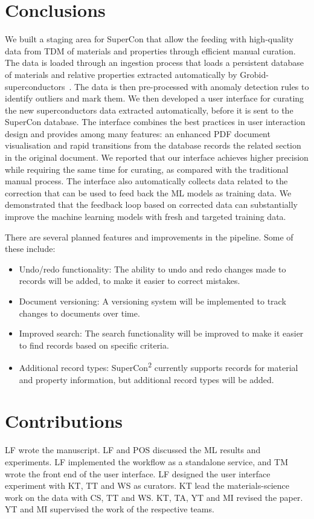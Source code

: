 \documentclass[a4paper]{article}
\begin{document}
\section{Conclusions}
We built a staging area for SuperCon that allow the feeding with high-quality data from TDM of materials and properties through efficient manual curation. 
The data is loaded through an ingestion process that loads a persistent database of materials and relative properties extracted automatically by Grobid-superconductors~\cite{lfoppiano2023automatic}. 
The data is then pre-processed with anomaly detection rules to identify outliers and mark them.
We then developed a user interface for curating the new superconductors data extracted automatically, before it is sent to the SuperCon database. 
The interface combines the best practices in user interaction design and provides among many features: an enhanced PDF document visualisation and rapid transitions from the database records the related section in the original document. 
We reported that our interface achieves higher precision while requiring the same time for curating, as compared with the traditional manual process.
The interface also automatically collects data related to the correction that can be used to feed back the ML models as training data. 
We demonstrated that the feedback loop based on corrected data can substantially improve the machine learning models with fresh and targeted training data. 

There are several planned features and improvements in the pipeline. Some of these include:

\begin{itemize}
    \item Undo/redo functionality: The ability to undo and redo changes made to records will be added, to make it easier to correct mistakes.
    \item Document versioning: A versioning system will be implemented to track changes to documents over time.
    \item Improved search: The search functionality will be improved to make it easier to find records based on specific criteria.
    \item Additional record types: SuperCon\textsuperscript{2} currently supports records for material and property information, but additional record types will be added.
\end{itemize}

\section*{Contributions}
LF wrote the manuscript. 
LF and POS discussed the ML results and experiments. 
LF implemented the workflow as a standalone service, and TM wrote the front end of the user interface. 
LF designed the user interface experiment with KT, TT and WS as curators.
KT lead the materials-science work on the data with CS, TT and WS.
KT, TA, YT and MI revised the paper.
YT and MI supervised the work of the respective teams. 




\end{document}
